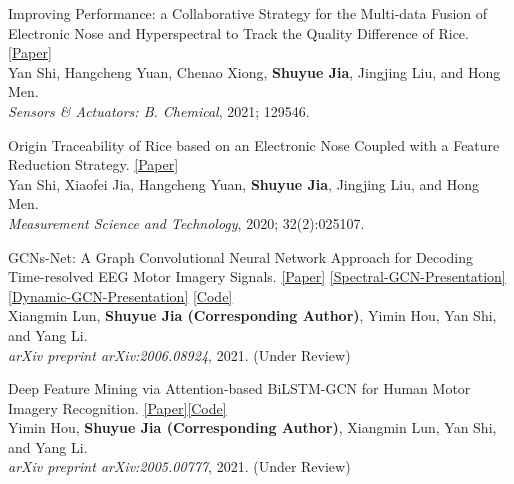 \documentclass{my_cv}
\begin{document}
\hspace*{\fill} 

\workitemsone
{Improving Performance: a Collaborative Strategy for the Multi-data Fusion of Electronic Nose and Hyperspectral to Track the Quality Difference of Rice. \href{https://www.sciencedirect.com/science/article/abs/pii/S0925400521001143}{[Paper]} \\
	Yan Shi, Hangcheng Yuan, Chenao Xiong, \textbf{Shuyue Jia}, Jingjing Liu, and Hong Men.\\
	\emph{Sensors \& Actuators: B. Chemical}, 2021; 129546.}

\hspace*{\fill}

\workitemsone
{Origin Traceability of Rice based on an Electronic Nose Coupled with a Feature Reduction Strategy. \href{https://iopscience.iop.org/article/10.1088/1361-6501/abb9e7/meta}{[Paper]} \\
	Yan Shi, Xiaofei Jia, Hangcheng Yuan, \textbf{Shuyue Jia}, Jingjing Liu, and Hong Men.\\
	\emph{Measurement Science and Technology}, 2020; 32(2):025107.}

\hspace*{\fill}

\workitemsone
{GCNs-Net: A Graph Convolutional Neural Network Approach for Decoding Time-resolved EEG Motor Imagery Signals. \href{https://arxiv.org/abs/2006.08924}{[Paper]} \href{https://shuyuej.com/files/GCNs-Net.pdf}{[Spectral-GCN-Presentation]} \href{https://shuyuej.com/files/Dynamic-GCN-Survey.pdf}{[Dynamic-GCN-Presentation]} \href{https://github.com/SuperBruceJia/EEG-DL}{[Code]}\\
	Xiangmin Lun, \textbf{Shuyue Jia (Corresponding Author)}, Yimin Hou, Yan Shi, and Yang Li.\\
	\emph{arXiv preprint arXiv:2006.08924}, 2021. (Under Review)}

\hspace*{\fill} 

\workitemsone
{Deep Feature Mining via Attention-based BiLSTM-GCN for Human Motor Imagery Recognition. \href{https://arxiv.org/abs/2005.00777}{[Paper]}\href{https://github.com/SuperBruceJia/EEG-DL}{[Code]}\\
	Yimin Hou, \textbf{Shuyue Jia (Corresponding Author)}, Xiangmin Lun, Yan Shi, and Yang Li.\\
	\emph{arXiv preprint arXiv:2005.00777}, 2021. (Under Review)}

\hspace*{\fill}
\end{document}
